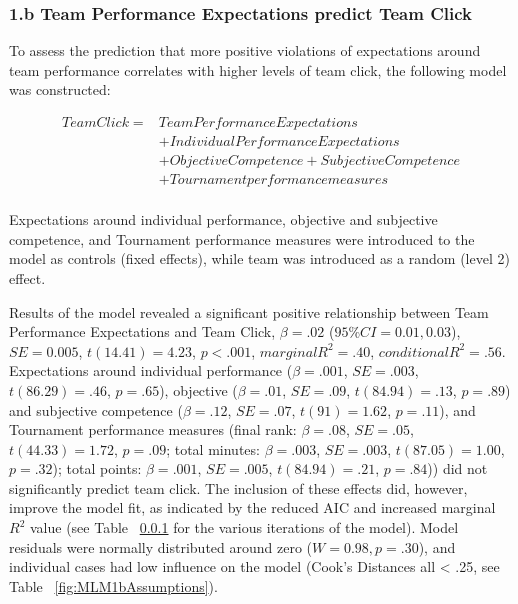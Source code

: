 \documentclass[12pt]{report}
\begin{document}
{\subsubsection{1.b Team Performance Expectations predict Team Click}

To assess the prediction that more positive violations of expectations around team performance correlates with higher levels of team click, the following model was constructed:

\begin{equation}
  \begin{align*}
    Team Click =  & Team Performance Expectations \\
              &+ Individual Performance Expectations \\
              &+ Objective Competence + Subjective Competence \\
              &+ Tournament performance measures \\
  \end{align*}
\end{equation}

Expectations around individual performance, objective and subjective competence, and Tournament performance measures were introduced to the model as controls (fixed effects), while team was introduced as a random (level 2) effect.

Results of the model revealed a significant positive relationship between Team Performance Expectations and Team Click, $\beta = .02$ ($95\% CI =  0.01, 0.03$), $SE = 0.005$, $t(14.41) = 4.23$, $p < .001$, $marginal R^2 = .40$, $conditional R^2 = .56$. Expectations around individual performance ($\beta = .001$, $SE = .003$, $t(86.29) = .46$, $p = .65$), objective ($\beta = .01$, $SE = .09$, $t(84.94) = .13$, $p = .89$) and subjective competence ($\beta = .12$, $SE = .07$, $t(91) = 1.62$, $p = .11$), and Tournament performance measures  (final rank: $\beta = .08$, $SE = .05$, $t(44.33) = 1.72$, $p = .09$; total minutes: $\beta = .003$, $SE = .003$, $t(87.05) = 1.00$, $p = .32$); total points: $\beta = .001$, $SE = .005$, $t(84.94) = .21$, $p = .84$)) did not significantly predict team click.  The inclusion of these effects did, however, improve the model fit, as indicated by the reduced AIC and increased marginal $R^2$ value (see Table ~\ref{} for the various iterations of the model).  Model residuals were normally distributed around zero ($W = 0.98, p = .30$), and individual cases had low influence on the model (Cook's Distances all < .25, see Table ~\ref{fig:MLM1bAssumptions}).


}
\end{document}
